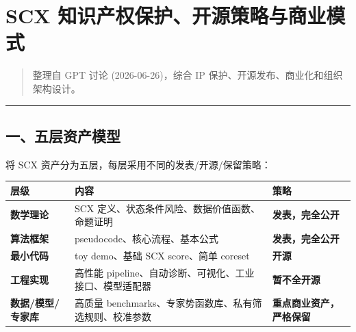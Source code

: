 \documentclass[
  12pt,
]{ctexart}
\author{SCX}
\date{2026}
\begin{document}
\section{SCX
知识产权保护、开源策略与商业模式}\label{scx-ux77e5ux8bc6ux4ea7ux6743ux4fddux62a4ux5f00ux6e90ux7b56ux7565ux4e0eux5546ux4e1aux6a21ux5f0f}

\begin{quote}
整理自 GPT 讨论 (2026-06-26)，综合 IP
保护、开源发布、商业化和组织架构设计。
\end{quote}

\begin{center}\rule{0.5\linewidth}{0.5pt}\end{center}

\subsection{一、五层资产模型}\label{ux4e00ux4e94ux5c42ux8d44ux4ea7ux6a21ux578b}

将 SCX 资产分为五层，每层采用不同的发表/开源/保留策略：

\begin{longtable}[]{@{}
  >{\raggedright\arraybackslash}p{}
  >{\raggedright\arraybackslash}p{}
  >{\raggedright\arraybackslash}p{}@{}}
\toprule\noalign{}
\begin{minipage}[b]{\linewidth}\raggedright
层级
\end{minipage} & \begin{minipage}[b]{\linewidth}\raggedright
内容
\end{minipage} & \begin{minipage}[b]{\linewidth}\raggedright
策略
\end{minipage} \\
\midrule\noalign{}
\endhead
\bottomrule\noalign{}
\endlastfoot
\textbf{数学理论} & SCX 定义、状态条件风险、数据价值函数、命题证明 &
\textbf{发表，完全公开} \\
\textbf{算法框架} & pseudocode、核心流程、基本公式 &
\textbf{发表，完全公开} \\
\textbf{最小代码} & toy demo、基础 SCX score、简单 coreset &
\textbf{开源} \\
\textbf{工程实现} & 高性能
pipeline、自动诊断、可视化、工业接口、模型适配器 &
\textbf{暂不全开源} \\
\textbf{数据/模型/专家库} & 高质量
benchmarks、专家势函数库、私有筛选规则、校准参数 &
\textbf{重点商业资产，严格保留} \\
\end{longtable}
\end{document}
